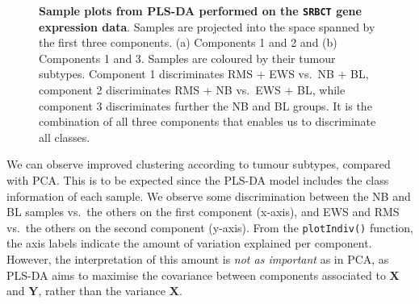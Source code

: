 \documentclass[]{book}
\begin{document}
\begin{figure}

{\centering {}

}

\caption{\textbf{Sample plots from PLS-DA performed on the \texttt{SRBCT} gene expression data}. Samples are projected into the space spanned by the first three components. (a) Components 1 and 2 and (b) Components 1 and 3. Samples are coloured by their tumour subtypes. Component 1 discriminates RMS + EWS vs.~NB + BL, component 2 discriminates RMS + NB vs.~EWS + BL, while component 3 discriminates further the NB and BL groups. It is the combination of all three components that enables us to discriminate all classes.}\label{fig:plsda-plotindiv}
\end{figure}



We can observe improved clustering according to tumour subtypes, compared with PCA. This is to be expected since the PLS-DA model includes the class information of each sample. We observe some discrimination between the NB and BL samples vs.~the others on the first component (x-axis), and EWS and RMS vs.~the others on the second component (y-axis). From the \texttt{plotIndiv()} function, the axis labels indicate the amount of variation explained per component. However, the interpretation of this amount is \emph{not as important} as in PCA, as PLS-DA aims to maximise the covariance between components associated to \(\boldsymbol X\) and \(\boldsymbol Y\), rather than the variance \(\boldsymbol X\).
\end{document}

